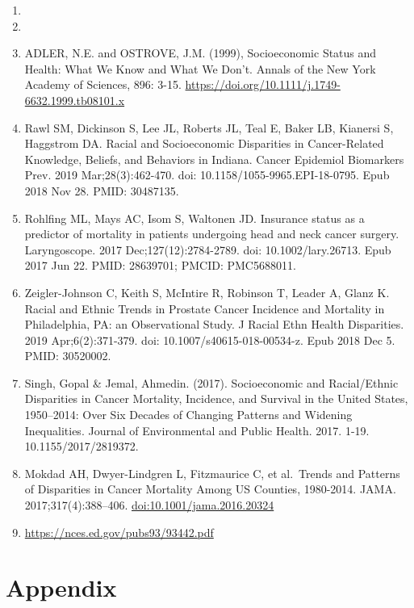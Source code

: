 \documentclass[
  11pt,
]{article}
\begin{document}
\begin{enumerate}
\def\labelenumi{\arabic{enumi}.}
\item
\item
\item
  ADLER, N.E. and OSTROVE, J.M. (1999), Socioeconomic Status and Health:
  What We Know and What We Don't. Annals of the New York Academy of
  Sciences, 896: 3-15.
  \url{https://doi.org/10.1111/j.1749-6632.1999.tb08101.x}
\item
  Rawl SM, Dickinson S, Lee JL, Roberts JL, Teal E, Baker LB, Kianersi
  S, Haggstrom DA. Racial and Socioeconomic Disparities in
  Cancer-Related Knowledge, Beliefs, and Behaviors in Indiana. Cancer
  Epidemiol Biomarkers Prev. 2019 Mar;28(3):462-470. doi:
  10.1158/1055-9965.EPI-18-0795. Epub 2018 Nov 28. PMID: 30487135.
\item
  Rohlfing ML, Mays AC, Isom S, Waltonen JD. Insurance status as a
  predictor of mortality in patients undergoing head and neck cancer
  surgery. Laryngoscope. 2017 Dec;127(12):2784-2789. doi:
  10.1002/lary.26713. Epub 2017 Jun 22. PMID: 28639701; PMCID:
  PMC5688011.
\item
  Zeigler-Johnson C, Keith S, McIntire R, Robinson T, Leader A, Glanz K.
  Racial and Ethnic Trends in Prostate Cancer Incidence and Mortality in
  Philadelphia, PA: an Observational Study. J Racial Ethn Health
  Disparities. 2019 Apr;6(2):371-379. doi: 10.1007/s40615-018-00534-z.
  Epub 2018 Dec 5. PMID: 30520002.
\item
  Singh, Gopal \& Jemal, Ahmedin. (2017). Socioeconomic and
  Racial/Ethnic Disparities in Cancer Mortality, Incidence, and Survival
  in the United States, 1950--2014: Over Six Decades of Changing
  Patterns and Widening Inequalities. Journal of Environmental and
  Public Health. 2017. 1-19. 10.1155/2017/2819372.
\item
  Mokdad AH, Dwyer-Lindgren L, Fitzmaurice C, et al.~Trends and Patterns
  of Disparities in Cancer Mortality Among US Counties, 1980-2014. JAMA.
  2017;317(4):388--406. \url{doi:10.1001/jama.2016.20324}
\item
  \url{https://nces.ed.gov/pubs93/93442.pdf}
\end{enumerate}

\pagebreak

\hypertarget{appendix}{%
\section{Appendix}\label{appendix}}
\end{document}
